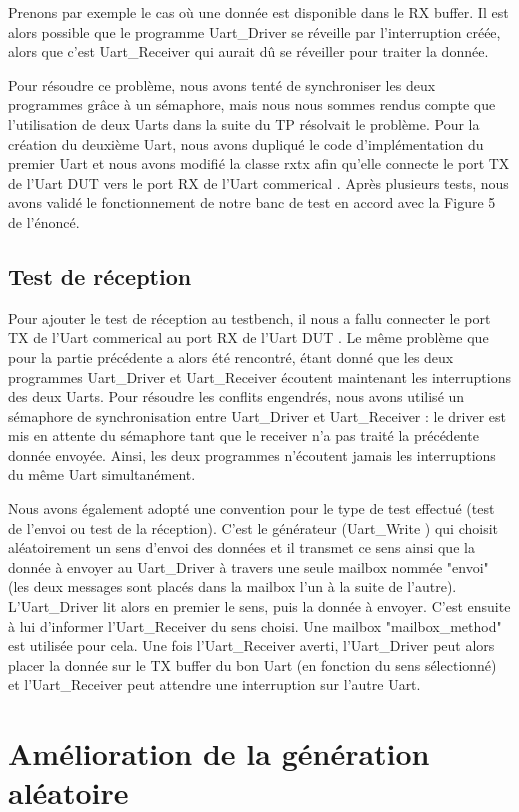 \documentclass[12pt, titlepage]{article}
\newcommand{\uwriter}{Uart\_Write }
\newcommand{\udriver}{Uart\_Driver }
\newcommand{\ureceiver}{Uart\_Receiver }
\newcommand{\theDut}{Uart DUT }
\newcommand{\ucom}{Uart commerical }
\begin{document}
	Prenons par exemple le cas où une donnée est disponible dans le RX buffer. Il est alors possible que le programme \udriver se réveille par l'interruption créée, alors que c'est \ureceiver qui aurait dû se réveiller pour traiter la donnée. 
    
    Pour résoudre ce problème, nous avons tenté de synchroniser les deux programmes grâce à un sémaphore, mais nous nous sommes rendus compte que l'utilisation de deux Uarts dans la suite du TP résolvait le problème. Pour la création du deuxième Uart, nous avons dupliqué le code d'implémentation du premier Uart et nous avons modifié la classe rxtx afin qu'elle connecte  le port TX de l'\theDut vers le port RX de l'\ucom. Après plusieurs tests, nous avons validé le fonctionnement de notre banc de test en accord avec la Figure 5 de l'énoncé.
    
    \subsection{Test de réception}
        Pour ajouter le test de réception au testbench, il nous a fallu connecter le port TX de l'\ucom au port RX de l'\theDut. Le même problème que pour la partie précédente a alors été rencontré, étant donné que les deux programmes \udriver et \ureceiver écoutent maintenant les interruptions des deux Uarts. Pour résoudre les conflits engendrés, nous avons utilisé un sémaphore de synchronisation entre \udriver et \ureceiver : le driver est mis en attente du sémaphore tant que le receiver n'a pas traité la précédente donnée envoyée. Ainsi, les deux programmes n'écoutent jamais les interruptions du même Uart simultanément. 
        
        Nous avons également adopté une convention pour le type de test effectué (test de l'envoi ou test de la réception). C'est le générateur (\uwriter) qui choisit aléatoirement un sens d'envoi des données et il transmet ce sens ainsi que la donnée à envoyer au \udriver à travers une seule mailbox nommée "envoi" (les deux messages sont placés dans la mailbox l'un à la suite de l'autre). L'\udriver lit alors en premier le sens, puis la donnée à envoyer. C'est ensuite à lui d'informer l'\ureceiver du sens choisi. Une mailbox "mailbox\_method" est utilisée pour cela. Une fois l'\ureceiver averti, l'\udriver peut alors placer la donnée sur le TX buffer du bon Uart (en fonction du sens sélectionné) et l'\ureceiver peut attendre une interruption sur l'autre Uart.


\section{Amélioration de la génération aléatoire} 
\end{document}
